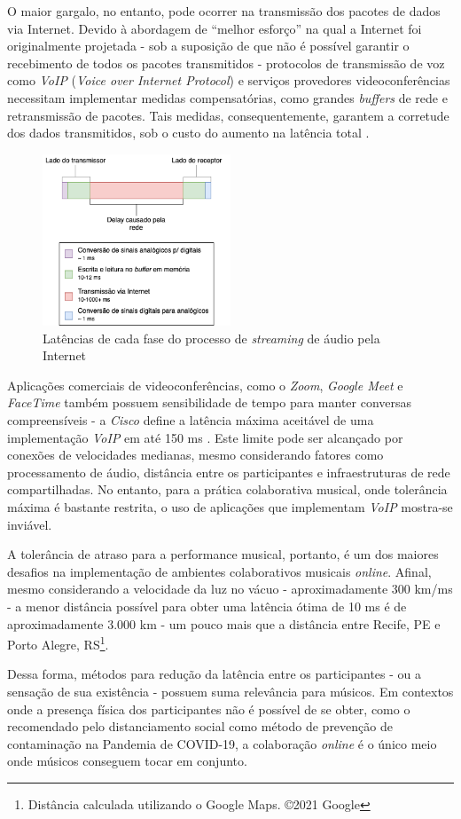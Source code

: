 O maior gargalo, no entanto, pode ocorrer na transmissão dos pacotes de dados via Internet. Devido à abordagem de ``melhor esforço'' na qual a Internet foi originalmente projetada - sob a suposição de que não é possível garantir o recebimento de todos os pacotes transmitidos - protocolos de transmissão de voz como \textit{VoIP} (\textit{Voice over Internet Protocol}) e serviços provedores videoconferências necessitam implementar medidas compensatórias, como grandes \textit{buffers} de rede e retransmissão de pacotes. Tais medidas, consequentemente, garantem a corretude dos dados transmitidos, sob o custo do aumento na latência total \cite{carot_low_latency}.

\begin{figure}[htbp]
\centering
\includegraphics[width=0.5\textwidth]{images/streaming-latency.png}
\caption{Latências de cada fase do processo de \textit{streaming} de áudio pela Internet}
\label{fig:streaming_latencies}
\end{figure}

Aplicações comerciais de videoconferências, como o \textit{Zoom}, \textit{Google Meet} e \textit{FaceTime} também  possuem sensibilidade de tempo para manter conversas compreensíveis - a \textit{Cisco} define a latência máxima aceitável de uma implementação \textit{VoIP} em até 150 ms \cite{cisco}. Este limite pode ser alcançado por conexões de velocidades medianas, mesmo considerando fatores como processamento de áudio, distância entre os participantes e infraestruturas de rede compartilhadas. No entanto, para a prática colaborativa musical, onde tolerância máxima é bastante restrita, o uso de aplicações que implementam \textit{VoIP} mostra-se inviável.

A tolerância de atraso para a performance musical, portanto, é um dos maiores desafios na implementação de ambientes colaborativos musicais \textit{online}. Afinal, mesmo considerando a velocidade da luz no vácuo - aproximadamente 300 km/ms \cite{speed_of_light} - a menor distância possível para obter uma latência ótima de 10 ms é de aproximadamente 3.000 km - um pouco mais que a distância entre Recife, PE e Porto Alegre, RS\footnote{Distância calculada utilizando o Google Maps. ©2021 Google}.

Dessa forma, métodos para redução da latência entre os participantes - ou a sensação de sua existência - possuem suma relevância para músicos. Em contextos onde a presença física dos participantes não é possível de se obter, como o recomendado pelo distanciamento social como método de prevenção de contaminação na Pandemia de COVID-19, a colaboração \textit{online} é o único meio onde músicos conseguem tocar em conjunto.
